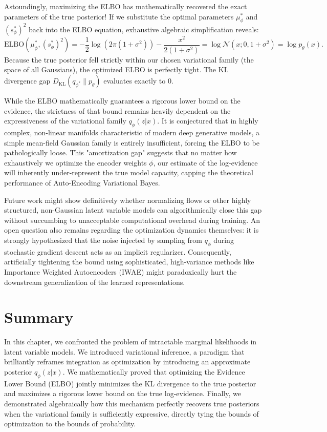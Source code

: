 Astoundingly, maximizing the ELBO has mathematically recovered the exact parameters of the true posterior! If we substitute the optimal parameters $\mu_\phi^*$ and $(s_\phi^*)^2$ back into the ELBO equation, exhaustive algebraic simplification reveals:
\begin{equation}
    \mathrm{ELBO}(\mu_\phi^*, (s_\phi^*)^2) = -\frac{1}{2}\log(2\pi(1+\sigma^2)) - \frac{x^2}{2(1+\sigma^2)} = \log \mathcal{N}(x; 0, 1+\sigma^2) = \log p_\theta(x).
\end{equation}
Because the true posterior fell strictly within our chosen variational family (the space of all Gaussians), the optimized ELBO is perfectly tight. The KL divergence gap $D_{\mathrm{KL}}(q_{\phi^*} \parallel p_\theta)$ evaluates exactly to 0.

\begin{horizon}
While the ELBO mathematically guarantees a rigorous lower bound on the evidence, the strictness of that bound remains heavily dependent on the expressiveness of the variational family $q_\phi(z|x)$. It is conjectured that in highly complex, non-linear manifolds characteristic of modern deep generative models, a simple mean-field Gaussian family is entirely insufficient, forcing the ELBO to be pathologically loose. This "amortization gap" suggests that no matter how exhaustively we optimize the encoder weights $\phi$, our estimate of the log-evidence will inherently under-represent the true model capacity, capping the theoretical performance of Auto-Encoding Variational Bayes.

Future work might show definitively whether normalizing flows or other highly structured, non-Gaussian latent variable models can algorithmically close this gap without succumbing to unacceptable computational overhead during training. An open question also remains regarding the optimization dynamics themselves: it is strongly hypothesized that the noise injected by sampling from $q_\phi$ during stochastic gradient descent acts as an implicit regularizer. Consequently, artificially tightening the bound using sophisticated, high-variance methods like Importance Weighted Autoencoders (IWAE) might paradoxically hurt the downstream generalization of the learned representations.
\end{horizon}

\section{Summary}
In this chapter, we confronted the problem of intractable marginal likelihoods in latent variable models. We introduced variational inference, a paradigm that brilliantly reframes integration as optimization by introducing an approximate posterior $q_\phi(z|x)$. We mathematically proved that optimizing the Evidence Lower Bound (ELBO) jointly minimizes the KL divergence to the true posterior and maximizes a rigorous lower bound on the true log-evidence. Finally, we demonstrated algebraically how this mechanism perfectly recovers true posteriors when the variational family is sufficiently expressive, directly tying the bounds of optimization to the bounds of probability.

